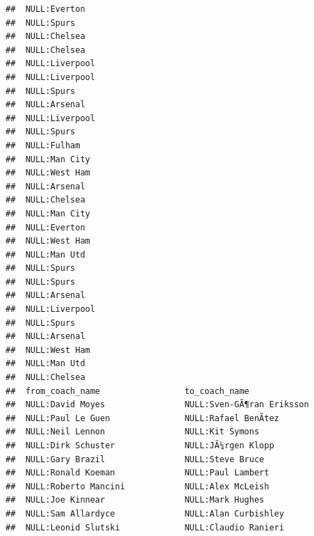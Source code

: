 \documentclass{article}\usepackage[]{graphicx}\usepackage[]{color}
\makeatletter
\newenvironment{kframe}{%
 \def\at@end@of@kframe{}%
 \ifinner\ifhmode%
  \def\at@end@of@kframe{\end{minipage}}%
  \begin{minipage}{\columnwidth}%
 \fi\fi%
 \def\FrameCommand##1{\hskip\@totalleftmargin \hskip-\fboxsep
 \colorbox{shadecolor}{##1}\hskip-\fboxsep
     \hskip-\linewidth \hskip-\@totalleftmargin \hskip\columnwidth}%
 \MakeFramed {\advance\hsize-\width
   \@totalleftmargin\z@ \linewidth\hsize
   \@setminipage}}%
 {\par\unskip\endMakeFramed%
 \at@end@of@kframe}
\newenvironment{knitrout}{}{} %
\makeatother
\begin{document}
\begin{knitrout}
\begin{kframe}
\begin{verbatim}
##  NULL:Everton                                                  
##  NULL:Spurs                                                    
##  NULL:Chelsea                                                  
##  NULL:Chelsea                                                  
##  NULL:Liverpool                                                
##  NULL:Liverpool                                                
##  NULL:Spurs                                                    
##  NULL:Arsenal                                                  
##  NULL:Liverpool                                                
##  NULL:Spurs                                                    
##  NULL:Fulham                                                   
##  NULL:Man City                                                 
##  NULL:West Ham                                                 
##  NULL:Arsenal                                                  
##  NULL:Chelsea                                                  
##  NULL:Man City                                                 
##  NULL:Everton                                                  
##  NULL:West Ham                                                 
##  NULL:Man Utd                                                  
##  NULL:Spurs                                                    
##  NULL:Spurs                                                    
##  NULL:Arsenal                                                  
##  NULL:Liverpool                                                
##  NULL:Spurs                                                    
##  NULL:Arsenal                                                  
##  NULL:West Ham                                                 
##  NULL:Man Utd                                                  
##  NULL:Chelsea                                                  
##  from_coach_name                 to_coach_name                
##  NULL:David Moyes                NULL:Sven-GÃ¶ran Eriksson    
##  NULL:Paul Le Guen               NULL:Rafael BenÃ­tez         
##  NULL:Neil Lennon                NULL:Kit Symons              
##  NULL:Dirk Schuster              NULL:JÃ¼rgen Klopp           
##  NULL:Gary Brazil                NULL:Steve Bruce             
##  NULL:Ronald Koeman              NULL:Paul Lambert            
##  NULL:Roberto Mancini            NULL:Alex McLeish            
##  NULL:Joe Kinnear                NULL:Mark Hughes             
##  NULL:Sam Allardyce              NULL:Alan Curbishley         
##  NULL:Leonid Slutski             NULL:Claudio Ranieri         

\end{verbatim}
\end{kframe}
\end{knitrout}
\end{document}
